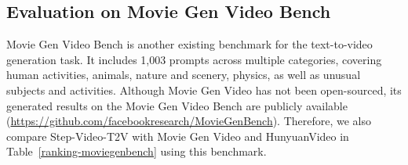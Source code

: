 \subsection{Evaluation on Movie Gen Video Bench}
Movie Gen Video Bench \cite{polyak2024moviegencastmedia} is another existing benchmark for the text-to-video generation task. It includes 1,003 prompts across multiple categories, covering human activities, animals, nature and scenery, physics, as well as unusual subjects and activities. Although Movie Gen Video has not been open-sourced, its generated results on the Movie Gen Video Bench are publicly available (\hyperlink{https://github.com/facebookresearch/MovieGenBench}{https://github.com/facebookresearch/MovieGenBench}). Therefore, we also compare Step-Video-T2V with Movie Gen Video and HunyuanVideo in Table~\ref{ranking-moviegenbench} using this benchmark.



